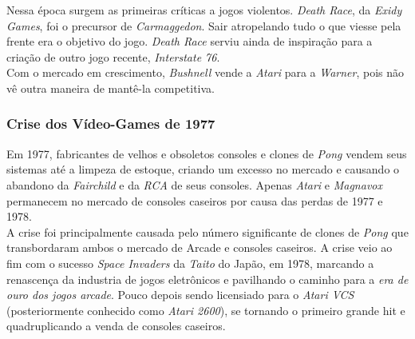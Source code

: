 \documentclass[paper=a4, fontsize=11pt]{scrartcl}	%
\numberwithin{equation}{section}															%
\numberwithin{figure}{section}																%
\numberwithin{table}{section}																%
\begin{document}
Nessa época surgem as primeiras críticas a jogos violentos. \textit{Death Race}, da \textit{Exidy Games}, foi o precursor de \textit{Carmaggedon}. Sair atropelando tudo o que viesse pela frente era o objetivo do jogo. \textit{Death Race} serviu ainda de inspiração para a criação de outro jogo recente, \textit{Interstate 76}.\\
Com o mercado em crescimento, \textit{Bushnell} vende a \textit{Atari} para a \textit{Warner}, pois não vê outra maneira de mantê-la competitiva.\\

\subsubsection*{Crise dos Vídeo-Games de 1977}
Em 1977, fabricantes de velhos e obsoletos consoles e clones de \textit{Pong} vendem seus sistemas até a limpeza de estoque, criando um excesso no mercado e causando o abandono da \textit{Fairchild} e da \textit{RCA} de seus consoles. Apenas \textit{Atari} e \textit{Magnavox} permanecem no mercado de consoles caseiros por causa das perdas de 1977 e 1978.\\
A crise foi principalmente causada pelo número significante de clones de \textit{Pong} que transbordaram ambos o mercado de Arcade e consoles caseiros. A crise veio ao fim com o sucesso \textit{Space Invaders} da \textit{Taito} do Japão, em 1978, marcando a renascença da industria de jogos eletrônicos e pavilhando o caminho para a \textit{era de ouro dos jogos arcade}. Pouco depois sendo licensiado para o \textit{Atari VCS} (posteriormente conhecido como \textit{Atari 2600}), se tornando o primeiro grande hit e quadruplicando a venda de consoles caseiros.
\end{document}
